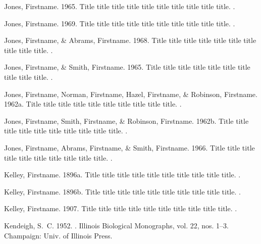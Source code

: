 \begin{thebibliography}{}
Jones, Firstname. 1965.
\newblock Title title title title title title title title title title.
.

Jones, Firstname. 1969.
\newblock Title title title title title title title title title title.
.

Jones, Firstname, \& Abrams, Firstname. 1968.
\newblock Title title title title title title title title title title.
.

Jones, Firstname, \& Smith, Firstname. 1965.
\newblock Title title title title title title title title title title.
.

Jones, Firstname, Norman, Firstname, Hazel, Firstname, \& Robinson, Firstname.
  1962a.
\newblock Title title title title title title title title title title.
.

Jones, Firstname, Smith, Firstname, \& Robinson, Firstname. 1962b.
\newblock Title title title title title title title title title title.
.

Jones, Firstname, Abrams, Firstname, \& Smith, Firstname. 1966.
\newblock Title title title title title title title title title title.
.

Kelley, Firstname. 1896a.
\newblock Title title title title title title title title title title.
.

Kelley, Firstname. 1896b.
\newblock Title title title title title title title title title title.
.

Kelley, Firstname. 1907.
\newblock Title title title title title title title title title title.
.

Kendeigh, S.~C. 1952.
.
\newblock Illinois Biological Monographs, vol. 22, nos.  1--3.
\newblock Champaign: Univ. of Illinois Press.


\end{thebibliography}
